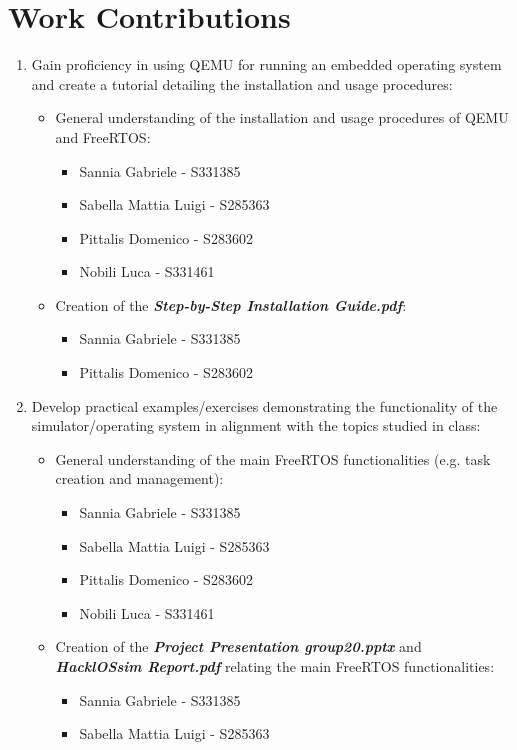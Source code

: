 \documentclass{article}
\begin{document}
\section{Work Contributions}
\begin{enumerate}
    \item Gain proficiency in using QEMU for running an embedded operating system and create a tutorial detailing the installation and usage procedures: 
    \begin{itemize}
        \item General understanding of the installation and usage procedures of QEMU and FreeRTOS:
        \begin{itemize}
            \item Sannia Gabriele - S331385
            \item Sabella Mattia Luigi - S285363
            \item Pittalis Domenico - S283602
            \item Nobili Luca - S331461
        \end{itemize}

        \item Creation of the \textit{\textbf{Step-by-Step Installation Guide.pdf}}:
        \begin{itemize}
            \item Sannia Gabriele - S331385
            \item Pittalis Domenico - S283602
        \end{itemize}
    \end{itemize}

    \item Develop practical examples/exercises demonstrating the functionality of the simulator/operating system in alignment with the topics studied in class:
    \begin{itemize}
        \item General understanding of the main FreeRTOS functionalities (e.g. task creation and management):
        \begin{itemize}
            \item Sannia Gabriele - S331385
            \item Sabella Mattia Luigi - S285363
            \item Pittalis Domenico - S283602
            \item Nobili Luca - S331461
        \end{itemize}

        \item Creation of the \textit{\textbf{Project Presentation group20.pptx}} and \textit{\textbf{HacklOSsim Report.pdf}} relating the main FreeRTOS functionalities:
        \begin{itemize}
            \item Sannia Gabriele - S331385
            \item Sabella Mattia Luigi - S285363
        \end{itemize}
    \end{itemize}


\end{enumerate}
\end{document}
